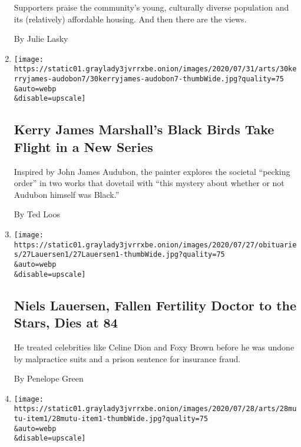 \begin{enumerate}
  Supporters praise the community's young, culturally diverse population
  and its (relatively) affordable housing. And then there are the views.

  By Julie Lasky
\item
  \href{/2020/07/29/arts/design/kerry-james-marshall-audubon.html}{}

  \texttt{[image: https://static01.graylady3jvrrxbe.onion/images/2020/07/31/arts/30kerryjames-audobon7/30kerryjames-audobon7-thumbWide.jpg?quality=75\\\&auto=webp\\\&disable=upscale]}

  \hypertarget{kerry-james-marshalls-black-birds-take-flight-in-a-new-series}{%
  \subsection{Kerry James Marshall's Black Birds Take Flight in a New
  Series}\label{kerry-james-marshalls-black-birds-take-flight-in-a-new-series}}

  Inspired by John James Audubon, the painter explores the societal
  ``pecking order'' in two works that dovetail with ``this mystery about
  whether or not Audubon himself was Black.''

  By Ted Loos
\item
  \href{/2020/07/28/nyregion/niels-h-lauersen-dead.html}{}

  \texttt{[image: https://static01.graylady3jvrrxbe.onion/images/2020/07/27/obituaries/27Lauersen1/27Lauersen1-thumbWide.jpg?quality=75\\\&auto=webp\\\&disable=upscale]}

  \hypertarget{niels-lauersen-fallen-fertility-doctor-to-the-stars-dies-at-84}{%
  \subsection{Niels Lauersen, Fallen Fertility Doctor to the Stars, Dies
  at
  84}\label{niels-lauersen-fallen-fertility-doctor-to-the-stars-dies-at-84}}

  He treated celebrities like Celine Dion and Foxy Brown before he was
  undone by malpractice suits and a prison sentence for insurance fraud.

  By Penelope Green
\item
  \href{/2020/07/28/arts/design/met-museum-wangechi-mutu.html}{}

  \texttt{[image: https://static01.graylady3jvrrxbe.onion/images/2020/07/28/arts/28mutu-item1/28mutu-item1-thumbWide.jpg?quality=75\\\&auto=webp\\\&disable=upscale]}


\end{enumerate}
